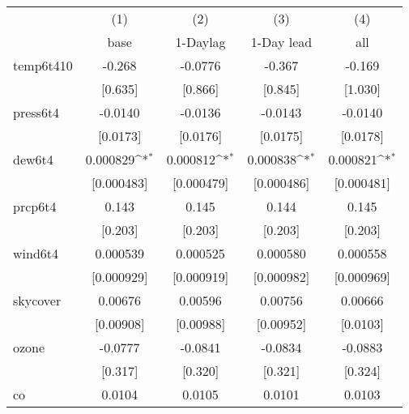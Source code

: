 {
\def\sym#1{\ifmmode^{#1}\else\(^{#1}\)\fi}
\begin{tabular}{l*{4}{c}}
\hline\hline
            &\multicolumn{1}{c}{(1)}&\multicolumn{1}{c}{(2)}&\multicolumn{1}{c}{(3)}&\multicolumn{1}{c}{(4)}\\
            &\multicolumn{1}{c}{base}&\multicolumn{1}{c}{1-Daylag}&\multicolumn{1}{c}{1-Day lead}&\multicolumn{1}{c}{all}\\
\hline
temp6t410   &      -0.268         &     -0.0776         &      -0.367         &      -0.169         \\
            &     [0.635]         &     [0.866]         &     [0.845]         &     [1.030]         \\
[1em]
press6t4    &     -0.0140         &     -0.0136         &     -0.0143         &     -0.0140         \\
            &    [0.0173]         &    [0.0176]         &    [0.0175]         &    [0.0178]         \\
[1em]
dew6t4      &    0.000829\sym{*}  &    0.000812\sym{*}  &    0.000838\sym{*}  &    0.000821\sym{*}  \\
            &  [0.000483]         &  [0.000479]         &  [0.000486]         &  [0.000481]         \\
[1em]
prcp6t4     &       0.143         &       0.145         &       0.144         &       0.145         \\
            &     [0.203]         &     [0.203]         &     [0.203]         &     [0.203]         \\
[1em]
wind6t4     &    0.000539         &    0.000525         &    0.000580         &    0.000558         \\
            &  [0.000929]         &  [0.000919]         &  [0.000982]         &  [0.000969]         \\
[1em]
skycover    &     0.00676         &     0.00596         &     0.00756         &     0.00666         \\
            &   [0.00908]         &   [0.00988]         &   [0.00952]         &    [0.0103]         \\
[1em]
ozone       &     -0.0777         &     -0.0841         &     -0.0834         &     -0.0883         \\
            &     [0.317]         &     [0.320]         &     [0.321]         &     [0.324]         \\
[1em]
co          &      0.0104         &      0.0105         &      0.0101         &      0.0103         \\

\end{tabular}}
